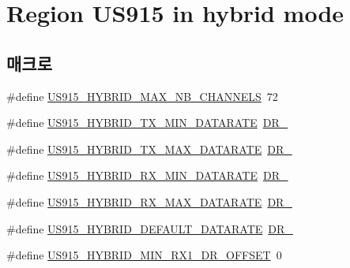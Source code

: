 \hypertarget{group___r_e_g_i_o_n_u_s915_h_y_b}{}\section{Region U\+S915 in hybrid mode}
\label{group___r_e_g_i_o_n_u_s915_h_y_b}
\subsection*{매크로}
\begin{DoxyCompactItemize}
\item 
\#define \mbox{\hyperlink{group___r_e_g_i_o_n_u_s915_h_y_b_ga977b73cbf7a5d15e2bf543fad5f35710}{U\+S915\+\_\+\+H\+Y\+B\+R\+I\+D\+\_\+\+M\+A\+X\+\_\+\+N\+B\+\_\+\+C\+H\+A\+N\+N\+E\+LS}}~72
\item 
\#define \mbox{\hyperlink{group___r_e_g_i_o_n_u_s915_h_y_b_ga6c7ab6789cb7bb1a5c1e22833905f787}{U\+S915\+\_\+\+H\+Y\+B\+R\+I\+D\+\_\+\+T\+X\+\_\+\+M\+I\+N\+\_\+\+D\+A\+T\+A\+R\+A\+TE}}~\mbox{\hyperlink{group___r_e_g_i_o_n_ga6c4ef966b4f3d5eb7597b087f2b97095}{D\+R\+\_}}
\item 
\#define \mbox{\hyperlink{group___r_e_g_i_o_n_u_s915_h_y_b_ga41872f6bb20d1dca0b778205ada36348}{U\+S915\+\_\+\+H\+Y\+B\+R\+I\+D\+\_\+\+T\+X\+\_\+\+M\+A\+X\+\_\+\+D\+A\+T\+A\+R\+A\+TE}}~\mbox{\hyperlink{group___r_e_g_i_o_n_ga6ceba6158a7dab238e9d0b846fb47a0c}{D\+R\+\_}}
\item 
\#define \mbox{\hyperlink{group___r_e_g_i_o_n_u_s915_h_y_b_gaf3c327837e52fbc665c3857f3731c5fe}{U\+S915\+\_\+\+H\+Y\+B\+R\+I\+D\+\_\+\+R\+X\+\_\+\+M\+I\+N\+\_\+\+D\+A\+T\+A\+R\+A\+TE}}~\mbox{\hyperlink{group___r_e_g_i_o_n_ga44cc96ba80ae464cd9330b784d329c16}{D\+R\+\_}}
\item 
\#define \mbox{\hyperlink{group___r_e_g_i_o_n_u_s915_h_y_b_ga10a143c061143776288b241e17c1b58d}{U\+S915\+\_\+\+H\+Y\+B\+R\+I\+D\+\_\+\+R\+X\+\_\+\+M\+A\+X\+\_\+\+D\+A\+T\+A\+R\+A\+TE}}~\mbox{\hyperlink{group___r_e_g_i_o_n_ga226f47470cc69a6fe831f7c92709bc1f}{D\+R\+\_}}
\item 
\#define \mbox{\hyperlink{group___r_e_g_i_o_n_u_s915_h_y_b_ga1ab202b7df1ef278c238dd8958ea0d8a}{U\+S915\+\_\+\+H\+Y\+B\+R\+I\+D\+\_\+\+D\+E\+F\+A\+U\+L\+T\+\_\+\+D\+A\+T\+A\+R\+A\+TE}}~\mbox{\hyperlink{group___r_e_g_i_o_n_ga6c4ef966b4f3d5eb7597b087f2b97095}{D\+R\+\_}}
\item 
\#define \mbox{\hyperlink{group___r_e_g_i_o_n_u_s915_h_y_b_ga526b61da154115ac916e9f217d50cd07}{U\+S915\+\_\+\+H\+Y\+B\+R\+I\+D\+\_\+\+M\+I\+N\+\_\+\+R\+X1\+\_\+\+D\+R\+\_\+\+O\+F\+F\+S\+ET}}~0

\end{DoxyCompactItemize}
